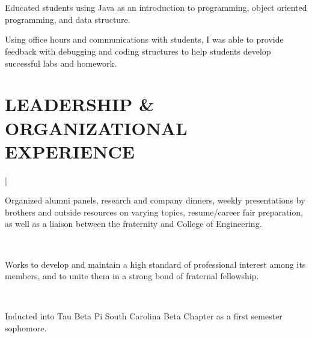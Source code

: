 \documentclass[letterpaper]{deedy-resume}
\begin{document}
\begin{minipage}[t]{0.69\textwidth}
\sectionspace

 \\
\\

\vspace{\topsep} 
\begin{tightitemize}
\item Educated students using Java as an introduction to programming, object oriented programming, and data structure.
\item Using office hours and communications with students, I was able to provide feedback with debugging and coding structures to help students develop successful labs and homework.
\end{tightitemize}


\sectionspace

\section{LEADERSHIP \& ORGANIZATIONAL EXPERIENCE}

\sectionspace

 |

\begin{tightitemize}
\item Organized alumni panels, research and company dinners, weekly presentations by brothers and outside resources on varying topics, resume/career fair preparation, as well as a liaison between the fraternity and College of Engineering.
\end{tightitemize}

\sectionspace 

 \\
\begin{tightitemize}
\item Works to develop and maintain a high standard of professional interest among its members, and to unite them in a strong bond of fraternal fellowship. 
\end{tightitemize}
\sectionspace 

  \\
\begin{tightitemize}
\item Inducted into Tau Beta Pi South Carolina Beta Chapter as a first semester sophomore.
\end{tightitemize}
\sectionspace 


\end{minipage}
\end{document}
